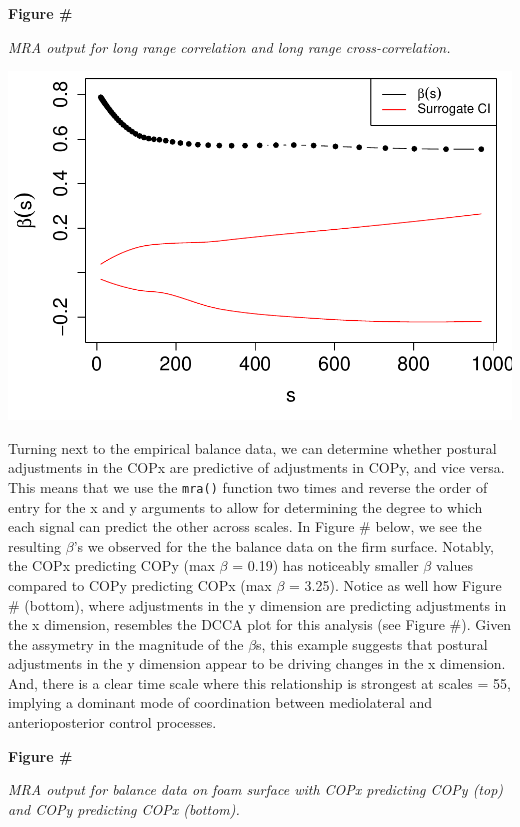 \documentclass[
  man]{apa6}
\begin{document}
\textbf{Figure \#}

\emph{MRA output for long range correlation and long range
cross-correlation.}

\includegraphics{fractal_regression_paper_brm_files/figure-latex/unnamed-chunk-23-1.pdf}

Turning next to the empirical balance data, we can determine whether
postural adjustments in the COPx are predictive of adjustments in COPy,
and vice versa. This means that we use the \texttt{mra()} function two times
and reverse the order of entry for the x and y arguments to allow for
determining the degree to which each signal can predict the other across
scales. In Figure \# below, we see the resulting \(\beta\)'s we observed
for the the balance data on the firm surface. Notably, the COPx
predicting COPy (max \(\beta\) = 0.19) has
noticeably smaller \(\beta\) values compared to COPy predicting COPx (max
\(\beta\) = 3.25). Notice as well how Figure \#
(bottom), where adjustments in the y dimension are predicting
adjustments in the x dimension, resembles the DCCA plot for this
analysis (see Figure \#). Given the assymetry in the magnitude of the
\(\beta\)s, this example suggests that postural adjustments in the y
dimension appear to be driving changes in the x dimension. And, there is
a clear time scale where this relationship is strongest at scales =
55, implying a
dominant mode of coordination between mediolateral and anterioposterior
control processes.

\textbf{Figure \#}

\emph{MRA output for balance data on foam surface with COPx predicting COPy
(top) and COPy predicting COPx (bottom).}
\end{document}
